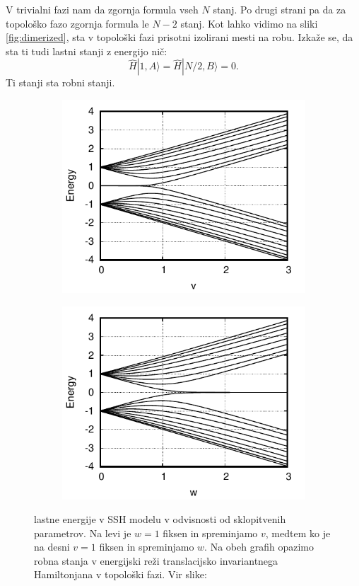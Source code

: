 V trivialni fazi nam da zgornja formula vseh $N$ stanj.  Po drugi strani pa da za topološko fazo zgornja formula le $N-2$ stanj. Kot lahko vidimo na sliki \ref{fig:dimerized}, sta v topološki fazi prisotni izolirani mesti na robu. Izkaže se, da sta ti tudi lastni stanji z energijo nič:
\begin{equation}
\hat{H} |1, A \rangle = \hat{H} | N/2, B \rangle = 0.
\end{equation}
Ti stanji sta robni stanji.
\begin{figure}[H]
\centering
\begin{subfigure}{.48\textwidth}
\includegraphics[width=\linewidth]{Figures/energy.pdf}
\end{subfigure}
\begin{subfigure}{.48\textwidth}
\includegraphics[width=\linewidth]{Figures/energy2.pdf}
\end{subfigure}
\caption{lastne energije v SSH modelu v odvisnosti od sklopitvenih parametrov. Na levi je $w=1$ fiksen in spreminjamo $v$, medtem ko je na desni $v=1$ fiksen in spreminjamo $w$. Na obeh grafih opazimo robna stanja v energijski reži translacijsko invariantnega Hamiltonjana v topološki fazi. Vir slike: \cite{arxiv}}
\label{fig:movingaway}
\end{figure}
